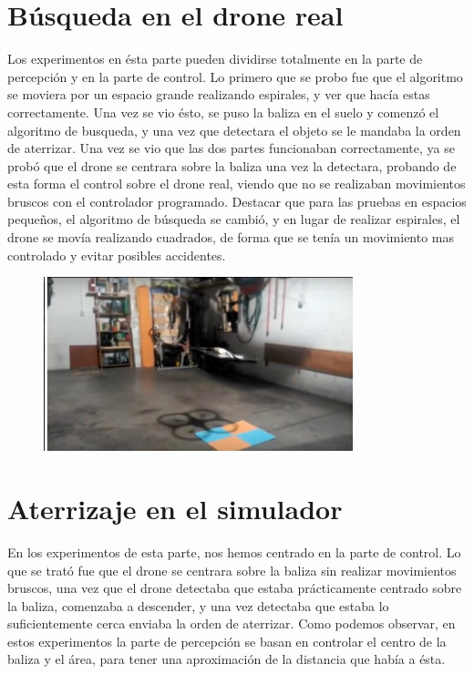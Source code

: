 \section{B\'usqueda en el drone real}
\hspace{1cm} Los experimentos en \'esta parte pueden dividirse totalmente en la parte de percepci\'on y en la parte de control. Lo primero que se probo fue que el algoritmo se moviera por un espacio grande realizando espirales, y ver que hac\'ia estas correctamente. Una vez se vio \'esto, se puso la baliza en el suelo y comenz\'o el algoritmo de busqueda, y una vez que detectara el objeto se le mandaba la orden de aterrizar. Una vez se vio que las dos partes funcionaban correctamente, ya se prob\'o que el drone se centrara sobre la baliza una vez la detectara, probando de esta forma el control sobre el drone real, viendo que no se realizaban movimientos bruscos con el controlador programado. Destacar que para las pruebas en espacios pequeños, el algoritmo de b\'usqueda se cambi\'o, y en lugar de realizar espirales, el drone se mov\'ia realizando cuadrados, de forma que se ten\'ia un movimiento mas controlado y evitar posibles accidentes. 
\begin{figure}[H]
	\centering
		\includegraphics[width=0.8\textwidth]{imgs/search_real.jpg}
	\label{fig:Despegue sobre la baliza del coche.}
\end{figure}

\section{Aterrizaje en el simulador}
\hspace{1cm} En los experimentos de esta parte, nos hemos centrado en la parte de control. Lo que se trat\'o fue que el drone se centrara sobre la baliza sin realizar movimientos bruscos, una vez que el drone detectaba que estaba pr\'acticamente centrado sobre la baliza, comenzaba a descender, y una vez detectaba que estaba lo suficientemente cerca enviaba la orden de aterrizar. Como podemos observar, en estos experimentos la parte de percepci\'on se basan en controlar el centro de la baliza y el \'area, para tener una aproximaci\'on de la distancia que hab\'ia a \'esta. 


